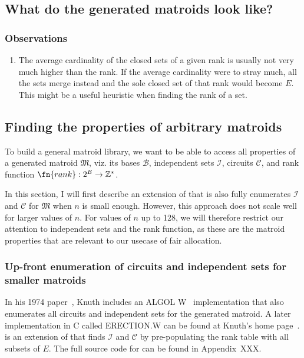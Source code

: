\subsection{What do the generated matroids look like?}
\subsubsection{Observations}
\begin{enumerate}
  \item The average cardinality of the closed sets of a given rank is usually not very much higher than the rank. If the average cardinality were to stray much, all the sets merge instead and the sole closed set of that rank would become $E$. This might be a useful heuristic when finding the rank of a set.
\end{enumerate}


\subsection{Finding the properties of arbitrary matroids}
To build a general matroid library, we want to be able to access all properties of a generated matroid $\mathfrak{M}$, viz. its bases $\mathcal{B}$, independent sets $\mathcal{I}$, circuits $\mathcal{C}$, and rank function $\fn{rank} : 2^E \to \mathbb{Z}^*$.

In this section, I will first describe an extension of  that is also fully enumerates $\mathcal{I}$ and $\mathcal{C}$ for $\mathfrak{M}$ when $n$ is small enough. However, this approach does not scale well for larger values of $n$. For values of $n$ up to 128, we will therefore restrict our attention to independent sets and the rank function, as these are the matroid properties that are relevant to our usecase of fair allocation.

\subsubsection{Up-front enumeration of circuits and independent sets for smaller matroids}
In his 1974 paper~\cite{knuth-1975}, Knuth includes an ALGOL W~\cite{wirth-1966} implementation that also enumerates all circuits and independent sets for the generated matroid. A later implementation in C called ERECTION.W can be found at Knuth's home page~\cite{knuth-2003}.  is an extension of  that finds $\mathcal{I}$ and $\mathcal{C}$ by pre-populating the rank table with all subsets of $E$. The full source code for  can be found in Appendix~XXX.

